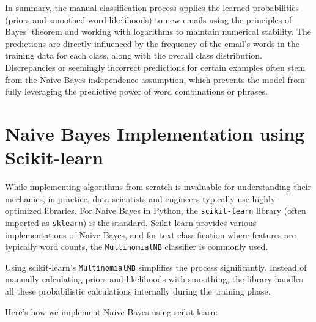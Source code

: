 \documentclass[12pt,letterpaper]{article}
\begin{document}
In summary, the manual classification process applies the learned probabilities (priors and smoothed word likelihoods) to new emails using the principles of Bayes' theorem and working with logarithms to maintain numerical stability. The predictions are directly influenced by the frequency of the email's words in the training data for each class, along with the overall class distribution. Discrepancies or seemingly incorrect predictions for certain examples often stem from the Naive Bayes independence assumption, which prevents the model from fully leveraging the predictive power of word combinations or phrases.

\section{Naive Bayes Implementation using Scikit-learn}

While implementing algorithms from scratch is invaluable for understanding their mechanics, in practice, data scientists and engineers typically use highly optimized libraries. For Naive Bayes in Python, the \texttt{scikit-learn} library (often imported as \texttt{sklearn}) is the standard. Scikit-learn provides various implementations of Naive Bayes, and for text classification where features are typically word counts, the \texttt{MultinomialNB} classifier is commonly used.

Using scikit-learn's \texttt{MultinomialNB} simplifies the process significantly. Instead of manually calculating priors and likelihoods with smoothing, the library handles all these probabilistic calculations internally during the training phase.

Here's how we implement Naive Bayes using scikit-learn:
\end{document}
